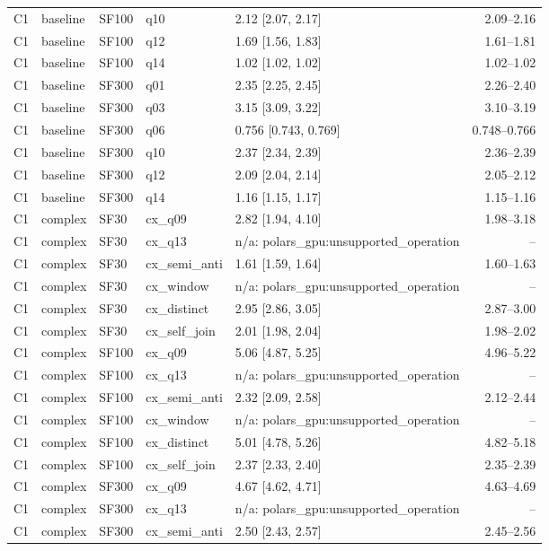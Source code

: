 \begin{longtable}{lllllr}
C1 & baseline & SF100 & q10 & 2.12 [2.07, 2.17] & 2.09--2.16 \\
C1 & baseline & SF100 & q12 & 1.69 [1.56, 1.83] & 1.61--1.81 \\
C1 & baseline & SF100 & q14 & 1.02 [1.02, 1.02] & 1.02--1.02 \\
C1 & baseline & SF300 & q01 & 2.35 [2.25, 2.45] & 2.26--2.40 \\
C1 & baseline & SF300 & q03 & 3.15 [3.09, 3.22] & 3.10--3.19 \\
C1 & baseline & SF300 & q06 & 0.756 [0.743, 0.769] & 0.748--0.766 \\
C1 & baseline & SF300 & q10 & 2.37 [2.34, 2.39] & 2.36--2.39 \\
C1 & baseline & SF300 & q12 & 2.09 [2.04, 2.14] & 2.05--2.12 \\
C1 & baseline & SF300 & q14 & 1.16 [1.15, 1.17] & 1.15--1.16 \\
C1 & complex & SF30 & cx\_q09 & 2.82 [1.94, 4.10] & 1.98--3.18 \\
C1 & complex & SF30 & cx\_q13 & n/a: polars\_gpu:unsupported\_operation & -- \\
C1 & complex & SF30 & cx\_semi\_anti & 1.61 [1.59, 1.64] & 1.60--1.63 \\
C1 & complex & SF30 & cx\_window & n/a: polars\_gpu:unsupported\_operation & -- \\
C1 & complex & SF30 & cx\_distinct & 2.95 [2.86, 3.05] & 2.87--3.00 \\
C1 & complex & SF30 & cx\_self\_join & 2.01 [1.98, 2.04] & 1.98--2.02 \\
C1 & complex & SF100 & cx\_q09 & 5.06 [4.87, 5.25] & 4.96--5.22 \\
C1 & complex & SF100 & cx\_q13 & n/a: polars\_gpu:unsupported\_operation & -- \\
C1 & complex & SF100 & cx\_semi\_anti & 2.32 [2.09, 2.58] & 2.12--2.44 \\
C1 & complex & SF100 & cx\_window & n/a: polars\_gpu:unsupported\_operation & -- \\
C1 & complex & SF100 & cx\_distinct & 5.01 [4.78, 5.26] & 4.82--5.18 \\
C1 & complex & SF100 & cx\_self\_join & 2.37 [2.33, 2.40] & 2.35--2.39 \\
C1 & complex & SF300 & cx\_q09 & 4.67 [4.62, 4.71] & 4.63--4.69 \\
C1 & complex & SF300 & cx\_q13 & n/a: polars\_gpu:unsupported\_operation & -- \\
C1 & complex & SF300 & cx\_semi\_anti & 2.50 [2.43, 2.57] & 2.45--2.56 \\

\end{longtable}
